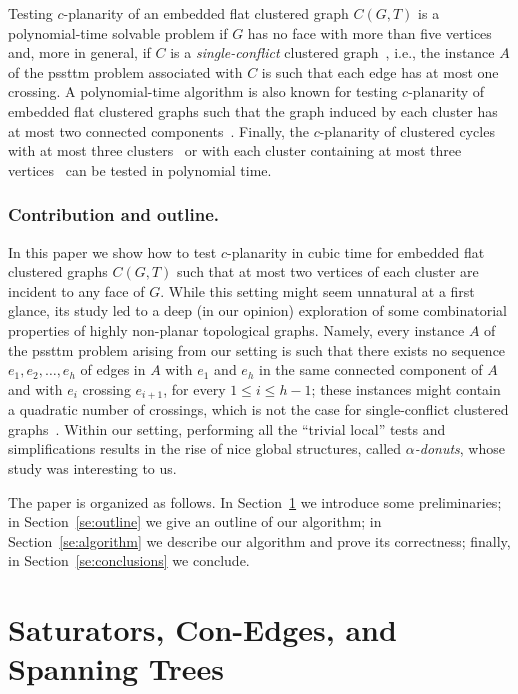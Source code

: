 \documentclass[letter,runningheads]{llncs}
\begin{document}
Testing $c$-planarity of an embedded flat clustered graph $C(G,T)$ is a polynomial-time solvable problem if $G$ has no face with more than five vertices and, more in general, if $C$ is a {\em single-conflict} clustered graph~\cite{df-ectefcgsf-09}, i.e., the instance $A$ of the {\sc pssttm} problem associated with $C$ is such that each edge has at most one crossing. A polynomial-time algorithm is also known for testing $c$-planarity of embedded flat clustered graphs such that the graph induced by each cluster has at most two connected components~\cite{jjkl-ecgtcc-09}. Finally, the $c$-planarity of clustered cycles with at most three clusters~\cite{cdpp-cccc-05} or with each cluster containing at most three vertices~\cite{jkkpsv-scceg-09} can be tested in polynomial time.

\subsubsection*{Contribution and outline.} In this paper we show how to test $c$-planarity in cubic time for embedded flat clustered graphs $C(G,T)$ such that at most two vertices of each cluster are incident to any face of $G$. While this setting might seem unnatural at a first glance, its study led to a deep (in our opinion) exploration of some combinatorial properties of highly non-planar topological graphs. Namely, every instance $A$ of the {\sc pssttm} problem arising from our setting is such that there exists no sequence $e_1,e_2,\dots,e_h$ of edges in $A$ with $e_1$ and $e_h$ in the same connected component of $A$ and with $e_i$ crossing $e_{i+1}$, for every $1\leq i\leq h-1$; these instances might contain a quadratic number of crossings, which is not the case for single-conflict clustered graphs~\cite{df-ectefcgsf-09}. Within our setting, performing all the ``trivial local'' tests and simplifications results in the rise of nice global structures, called {\em $\alpha$-donuts}, whose study was interesting to us.

The paper is organized as follows. In Section~\ref{se:preliminaries} we introduce some preliminaries; in Section~\ref{se:outline} we give an outline of our algorithm; in Section~\ref{se:algorithm} we describe our algorithm and prove its correctness; finally, in Section~\ref{se:conclusions} we conclude.

\section{Saturators, Con-Edges, and Spanning Trees} \label{se:preliminaries}
\end{document}
